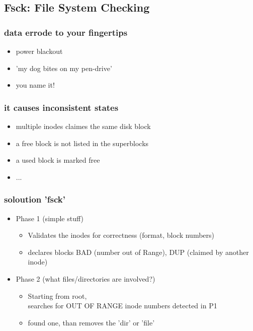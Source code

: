\documentclass[handout]{beamer}
\begin{document}
    \subsection{Fsck: File System Checking}
	    \begin{frame}
			\frametitle{data errode to your fingertips}
			\begin{itemize}
                \item<1-> power blackout
                \item<1-> 'my dog bites on my pen-drive'
                \item<1-> you name it!
            \end{itemize}
        \end{frame}
        \begin{frame}
			\frametitle{it causes inconsistent states}
            \begin{itemize}
                \item<1-> multiple inodes claimes the same disk block
                \item<1-> a free block is not listed in the superblocks
                \item<1-> a used block is marked free
                \item<1-> ...
            \end{itemize}
		\end{frame}
        \begin{frame}
			\frametitle{soloution 'fsck'}
            \begin{itemize}
                \item<1-> Phase 1 (simple stuff)
                \begin{itemize}
                    \item<1-> Validates the inodes for correctness (format, block numbers)
                    \item<1-> declares blocks BAD (number out of Range), DUP (claimed by another inode)
                \end{itemize}
                \item<2-> Phase 2 (what files/directories are involved?)
                \begin{itemize}
                    \item<2-> Starting from root, \\
                              searches for OUT OF RANGE inode numbers detected in P1
                    \item<2-> found one, than removes the 'dir' or 'file'
                \end{itemize}
            \end{itemize}
        \end{frame}
\end{document}
